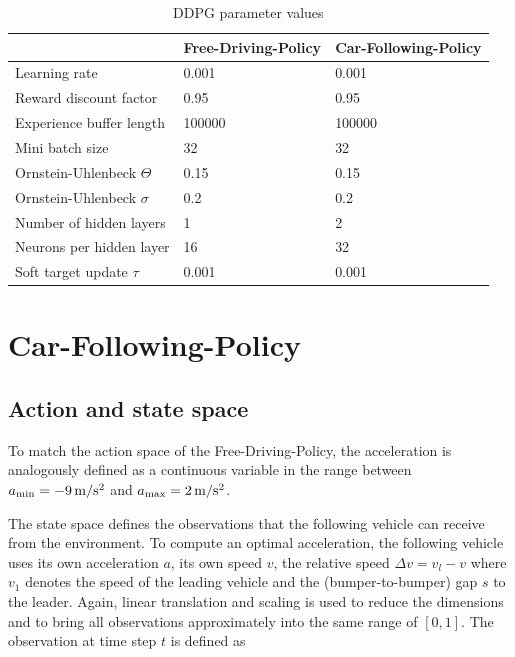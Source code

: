 \documentclass[review]{elsarticle}
\providecommand{\sub}[1]{_{\mathrm{#1}}}  %
\providecommand{\3}{{\ss}}
\begin{document}
  \begin{table}
	\caption{DDPG parameter values} 
	\label{tab:DDPGparameters} 
	\begin{center}
		\begin{tabular}{ p{} p{}  p{} }
			 & Free-Driving-Policy & Car-Following-Policy \\ \hline
			Learning rate & 0.001 & 0.001\\ 
			Reward discount factor & 0.95 & 0.95 \\ 
			Experience buffer length & 100000 & 100000 \\ 
			Mini batch size & 32 & 32 \\ 			
			Ornstein-Uhlenbeck  $\Theta$ & 0.15& 0.15 \\ 
			Ornstein-Uhlenbeck  $\sigma$ & 0.2 & 0.2 \\ 
			Number of hidden layers & 1 & 2\\
			Neurons per hidden layer & 16 & 32\\
			Soft target update  $\tau$ & 0.001 & 0.001\\
			
			
		\end{tabular}
	\end{center}
\end{table}


\section{Car-Following-Policy}
\subsection{Action and state space}
\label{actionSpace1}
To match the action space of the Free-Driving-Policy, the acceleration is analogously defined as a continuous variable in the range between $a\sub{\rm min} = \unit[-9]{m/s^2}$ and 
$a\sub{\rm max} =\unit[2]{m/s^2}$.


The state space defines the observations that the following
vehicle can receive from the environment. To compute an optimal
acceleration, the following vehicle uses its own acceleration $a$,
its own speed $v$, the relative speed $\Delta v=v_l-v$ where $v_1$ denotes
the speed of the leading vehicle  and the (bumper-to-bumper)
gap $s$ to the leader. Again, linear translation and scaling is used to reduce the dimensions and to bring all observations approximately into the same range of $[0,1]$. The observation at time step $t$ is defined as
\end{document}
